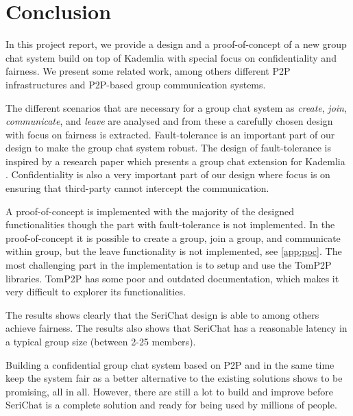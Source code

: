 \chapter{Conclusion}
\label{cha:conclusion}
In this project report, we provide a design and a proof-of-concept of a new group chat system build on top of Kademlia with special focus on confidentiality and fairness.
We present some related work, among others different P2P infrastructures and P2P-based group communication systems.

The different scenarios that are necessary for a group chat system as \emph{create}, \emph{join}, \emph{communicate}, and \emph{leave} are analysed and from these a carefully chosen design with focus on fairness is extracted. 
Fault-tolerance is an important part of our design to make the group chat system robust. The design of fault-tolerance is inspired by a research paper which presents a group chat extension for Kademlia \cite{matl2015effective}.
Confidentiality is also a very important part of our design where focus is on ensuring that third-party cannot intercept the communication.

A proof-of-concept is implemented with the majority of the designed functionalities though the part with fault-tolerance is not implemented. In the proof-of-concept it is possible to create a group, join a group, and communicate within group, but the leave functionality is not implemented, see \autoref{app:poc}. 
The most challenging part in the implementation is to setup and use the TomP2P libraries. TomP2P has some poor and outdated documentation, which makes it very difficult to explorer its functionalities.  

The results shows clearly that the SeriChat design is able to among others achieve fairness. The results also shows that SeriChat has a reasonable latency in a typical group size (between 2-25 members). 

Building a confidential group chat system based on P2P and in the same time keep the system fair as a better alternative to the existing solutions shows to be promising, all in all. However, there are still a lot to build and improve before SeriChat is a complete solution and ready for being used by millions of people.